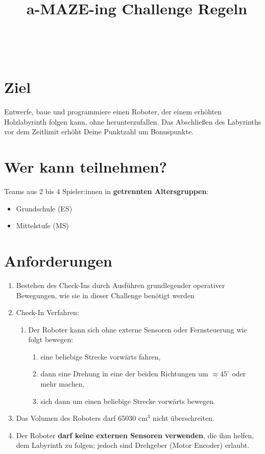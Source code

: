 \documentclass[a4paper,12pt]{article}
\begin{document}



\title{\tagYear\ a-MAZE-ing Challenge Regeln}

\makeatletter
\let\inserttitle\@title
\makeatother
\begin{center}
	\rrgerLogo
	\huge                      %
	\bfseries                   %
	\\
	\inserttitle
\end{center}
\section{Ziel}
Entwerfe, baue und programmiere einen Roboter, der einem erhöhten Holzlabyrinth
folgen kann, ohne herunterzufallen. Das Abschließen des Labyrinths vor dem
Zeitlimit erhöht Deine Punktzahl um Bonuspunkte.

\section{Wer kann teilnehmen?}
Teams aus 2 bis 4 Spieler:innen in \textbf{getrennten Altersgruppen}:

\begin{itemize}
	\item Grundschule (ES)
	\item Mittelstufe (MS)
\end{itemize}
\combineDivisions

\section{Anforderungen}
\robotRequirements
\begin{enumerate}
	\item Bestehen des Check-Ins durch Ausführen grundlegender operativer
		Bewegungen, wie sie in dieser Challenge benötigt werden
	\item Check-In Verfahren:
	\begin{enumerate}
		\item Der Roboter kann sich ohne externe Sensoren oder
			Fernsteuerung wie folgt bewegen:
		\begin{enumerate}
			\item eine beliebige Strecke vorwärts fahren,
			\item dann eine Drehung in eine der beiden Richtungen
				um $\approx 45^{\circ}$ oder mehr machen,
			\item sich dann um einen beliebige Strecke vorwärts
				bewegen.
		\end{enumerate}
	\end{enumerate}
	\item Das Volumen des Roboters darf 65030 cm$^{3}$ nicht überschreiten.
	\item Der Roboter \textbf{darf keine externen Sensoren verwenden}, die
		ihm helfen, dem Labyrinth zu folgen; jedoch sind Drehgeber
		(Motor Encoder) erlaubt.
\end{enumerate}
\end{document}
